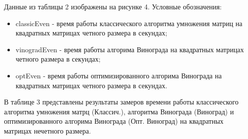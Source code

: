 \documentclass[a4paper,14pt]{report}
\begin{document}
\newpage
Данные из таблицы 2 изображены на рисунке 4. Условные обозначения:

\begin{itemize}
	\item classicEven - время работы классического алгоритма умножения матриц на квадратных матрицах четного размера в секундах;
		\item vinogradEven - время работы алгорима Винограда на квадратных матрицах четного размера в секундах;
			\item optEven - время работы оптимизированного алгорима Винограда на квадратных матрицах четного размера в секундах.
\end{itemize}

\begin{figure}[!h]
\end{figure}

В таблице 3 представлены результаты замеров времени работы классического алгоритма умножения матрц (Классич.), алгоритма Винограда (Виноград) и оптимизированного алгорима Винограда (Опт. Виноград) на квадратных матрицах нечетного размера.
\end{document}
